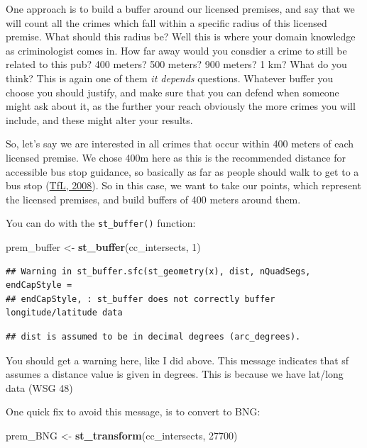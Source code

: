 \documentclass[]{book}
\newenvironment{Shaded}{\begin{snugshade}}{\end{snugshade}}
\newcommand{\DecValTok}[1]{\textcolor[rgb]{0.00,0.00,0.81}{#1}}
\newcommand{\KeywordTok}[1]{\textcolor[rgb]{0.13,0.29,0.53}{\textbf{#1}}}
\newcommand{\NormalTok}[1]{#1}
\newcommand{\StringTok}[1]{\textcolor[rgb]{0.31,0.60,0.02}{#1}}
\begin{document}
One approach is to build a buffer around our licensed premises, and say that we will count all the crimes which fall within a specific radius of this licensed premise. What should this radius be? Well this is where your domain knowledge as criminologist comes in. How far away would you consdier a crime to still be related to this pub? 400 meters? 500 meters? 900 meters? 1 km? What do you think? This is again one of them \emph{it depends} questions. Whatever buffer you choose you should justify, and make sure that you can defend when someone might ask about it, as the further your reach obviously the more crimes you will include, and these might alter your results.

So, let's say we are interested in all crimes that occur within 400 meters of each licensed premise. We chose 400m here as this is the recommended distance for accessible bus stop guidance, so basically as far as people should walk to get to a bus stop (\href{http://content.tfl.gov.uk/accessibile-bus-stop-design-guidance.pdf}{TfL, 2008}). So in this case, we want to take our points, which represent the licensed premises, and build buffers of 400 meters around them.

You can do with the \texttt{st\_buffer()} function:

\begin{Shaded}
\begin{Highlighting}[]
\NormalTok{prem_buffer <-}\StringTok{ }\KeywordTok{st_buffer}\NormalTok{(cc_intersects, }\DecValTok{1}\NormalTok{)}
\end{Highlighting}
\end{Shaded}

\begin{verbatim}
## Warning in st_buffer.sfc(st_geometry(x), dist, nQuadSegs, endCapStyle =
## endCapStyle, : st_buffer does not correctly buffer longitude/latitude data
\end{verbatim}

\begin{verbatim}
## dist is assumed to be in decimal degrees (arc_degrees).
\end{verbatim}

You should get a warning here, like I did above. This message indicates that sf assumes a distance value is given in degrees. This is because we have lat/long data (WSG 48)

One quick fix to avoid this message, is to convert to BNG:

\begin{Shaded}
\begin{Highlighting}[]
\NormalTok{prem_BNG <-}\StringTok{ }\KeywordTok{st_transform}\NormalTok{(cc_intersects, }\DecValTok{27700}\NormalTok{)}
\end{Highlighting}
\end{Shaded}
\end{document}

